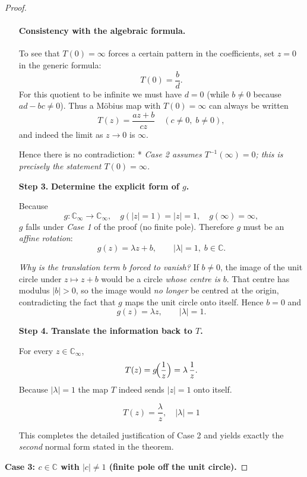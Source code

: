 \documentclass[12pt]{article}
\theoremstyle{definition} %
\theoremstyle{plain} %
\begin{document}
\begin{proof}
\begin{enumerate}
\paragraph{Consistency with the algebraic formula.}
To see that $T(0)=\infty$ forces a certain pattern in the coefficients,
set $z=0$ in the generic formula:
\[
   T(0)=\frac{b}{d}.
\]
For this quotient to be infinite we must have $d=0$ (while $b\neq0$
because $ad-bc\neq0$).  
Thus a Möbius map with $T(0)=\infty$ can always be written
\[
   T(z)=\frac{az+b}{cz}\quad(c\neq0,\;b\neq0),
\]
and indeed the limit as $z\to0$ is $\infty$.

Hence there is no contradiction:  
* \textit{Case 2 assumes $T^{-1}(\infty)=0$; this is precisely the
  statement $T(0)=\infty$.}
\item[\textbf{Step 3.}] \textbf{Determine the explicit form of $g$.}

Because
\[
   g:\mathbb{{C}}_\infty\longrightarrow\mathbb{{C}}_\infty,\quad
   g(\lvert z\rvert=1)=\lvert z\rvert=1,\quad
   g(\infty)=\infty,
\]
$g$ falls under \emph{Case 1} of the proof (no finite pole).  Therefore
$g$ must be an \emph{affine rotation}:
\[
   g(z)=\lambda z + b,
   \qquad |\lambda|=1,\;b\in\mathbb{{C}} .
\]

\medskip\noindent
\emph{Why is the translation term $b$ forced to vanish?}  
If $b\neq0$, the image of the unit circle under $z\mapsto z+b$
would be a circle \emph{whose centre is $b$}.  That centre has modulus
$|b|>0$, so the image would \emph{no longer} be centred at the origin,
contradicting the fact that $g$ maps the unit circle onto itself.
Hence $b=0$ and
\[
   g(z)=\lambda z,\qquad |\lambda|=1.
\]

\vspace{4pt}
\item[\textbf{Step 4.}] \textbf{Translate the information back to $T$.}

For every $z\in\mathbb{{C}}_\infty$,
\[
   T(z)=g\!\Bigl(\frac{1}{z}\Bigr)=\lambda\,\frac{1}{z}.
\]
Because $|\lambda|=1$ the map $T$ indeed sends $|z|=1$ onto itself.

\vspace{2pt}
\[
   \boxed{\;T(z)=\frac{\lambda}{z},\quad |\lambda|=1\;}
\]

This completes the detailed justification of Case 2 and yields exactly
the \emph{second} normal form stated in the theorem.
\end{enumerate}
   \bigskip
   \noindent\textbf{Case 3: $c\in\mathbb{{C}}$ with $|c|\neq1$ (finite pole off the unit circle).}
   

\end{proof}
\end{document}
